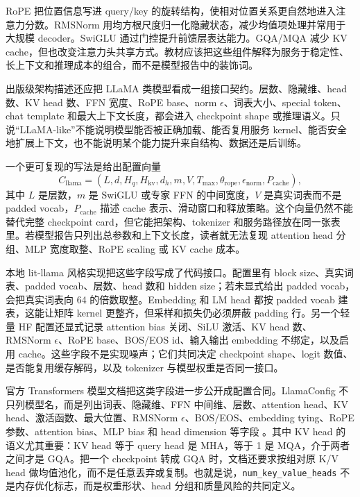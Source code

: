 \documentclass[UTF8,zihao=-4,openany]{ctexbook}
\begin{document}
RoPE 把位置信息写进 query/key 的旋转结构，使相对位置关系更自然地进入注意力分数。RMSNorm 用均方根尺度归一化隐藏状态，减少均值项处理并常用于大规模 decoder。SwiGLU 通过门控提升前馈层表达能力。GQA/MQA 减少 KV cache，但也改变注意力头共享方式。教材应该把这些组件解释为服务于稳定性、长上下文和推理成本的组合，而不是模型报告中的装饰词。

出版级架构描述还应把 LLaMA 类模型看成一组接口契约。层数、隐藏维、head 数、KV head 数、FFN 宽度、RoPE base、norm $\epsilon$、词表大小、special token、chat template 和最大上下文长度，都会进入 checkpoint shape 或推理语义。只说“LLaMA-like”不能说明模型能否被正确加载、能否复用服务 kernel、能否安全地扩展上下文，也不能说明某个能力提升来自结构、数据还是后训练。

一个更可复现的写法是给出配置向量
\[
  C_{\mathrm{llama}}=(L,d,H_q,H_{\mathrm{kv}},d_h,m,V,T_{\max},\theta_{\mathrm{rope}},\epsilon_{\mathrm{norm}},P_{\mathrm{cache}}),
\]
其中 $L$ 是层数，$m$ 是 SwiGLU 或专家 FFN 的中间宽度，$V$ 是真实词表而不是 padded vocab，$P_{\mathrm{cache}}$ 描述 cache 表示、滑动窗口和释放策略。这个向量仍然不能替代完整 checkpoint card，但它能把架构、tokenizer 和服务路径放在同一张表里。若模型报告只列出总参数和上下文长度，读者就无法复现 attention head 分组、MLP 宽度取整、RoPE scaling 或 KV cache 成本。

本地 lit-llama 风格实现把这些字段写成了代码接口。配置里有 block size、真实词表、padded vocab、层数、head 数和 hidden size；若未显式给出 padded vocab，会把真实词表向 64 的倍数取整。Embedding 和 LM head 都按 padded vocab 建表，这能让矩阵 kernel 更整齐，但采样和损失仍必须屏蔽 padding 行。另一个轻量 HF 配置还显式记录 attention bias 关闭、SiLU 激活、KV head 数、RMSNorm $\epsilon$、RoPE base、BOS/EOS id、输入输出 embedding 不绑定，以及启用 cache。这些字段不是实现噪声；它们共同决定 checkpoint shape、logit 数值、是否能复用缓存解码，以及 tokenizer 与模型权重是否同一接口。

官方 Transformers 模型文档把这类字段进一步公开成配置合同。LlamaConfig 不只列模型名，而是列出词表、隐藏维、FFN 中间维、层数、attention head、KV head、激活函数、最大位置、RMSNorm $\epsilon$、BOS/EOS、embedding tying、RoPE 参数、attention bias、MLP bias 和 head dimension 等字段 \cite{huggingface2026transformersllama}。其中 KV head 的语义尤其重要：KV head 等于 query head 是 MHA，等于 1 是 MQA，介于两者之间才是 GQA。把一个 checkpoint 转成 GQA 时，文档还要求按组对原 K/V head 做均值池化，而不是任意丢弃或复制。也就是说，\texttt{num\_key\_value\_heads} 不是内存优化标志，而是权重形状、head 分组和质量风险的共同定义。
\end{document}
